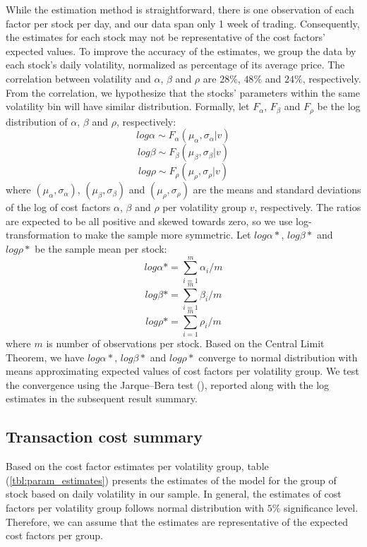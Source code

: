 While the estimation method is straightforward, there is one observation of each factor per stock per day, and our data span only 1 week of trading. Consequently, the estimates for each stock may not be representative of the cost factors' expected values. To improve the accuracy of the estimates, we group the data by each stock's daily volatility, normalized as percentage of its average price. The correlation between volatility and $\alpha$, $\beta$ and $\rho$ are $28\%$, $48\%$ and $24\%$, respectively. From the correlation, we hypothesize that the stocks' parameters within the same volatility bin will have similar distribution. Formally, let $F_\alpha$, $F_\beta$ and $F_\rho$ be the log distribution of $\alpha$, $\beta$ and $\rho$, respectively:
\[
  log \alpha \sim F_\alpha(\mu_\alpha,\sigma_\alpha|v)
\]
\[
  log \beta \sim F_\beta(\mu_\beta,\sigma_\beta|v)
\]
\[
  log \rho \sim F_\rho(\mu_\rho,\sigma_\rho|v)
\]
where $(\mu_\alpha,\sigma_\alpha)$, $(\mu_\beta,\sigma_\beta)$ and $(\mu_\rho,\sigma_\rho)$ are the means and standard deviations of the log of cost factors $\alpha$, $\beta$ and $\rho$ per volatility group $v$, respectively. The ratios are expected to be all positive and skewed towards zero, so we use log-transformation to make the sample more symmetric. Let $log \alpha*$, $log \beta*$ and $log \rho*$ be the sample mean per stock:
\[
  log \alpha* = \sum_{i=1}^m \alpha_i/m
\]
\[
  log \beta* = \sum_{i=1}^m \beta_i/m
\]
\[
  log \rho* = \sum_{i=1}^m \rho_i/m
\]
where $m$ is number of observations per stock. Based on the Central Limit Theorem, we have $log \alpha*$, $log \beta*$ and $log \rho*$ converge to normal distribution with means approximating expected values of cost factors per volatility group. We test the convergence using the Jarque–Bera test (\cite{JarqueBera1980}), reported along with the log estimates in the subsequent result summary.

\subsection{Transaction cost summary}

Based on the cost factor estimates per volatility group, table (\ref{tbl:param_estimates}) presents the estimates of the model for the group of stock based on daily volatility in our sample. In general, the estimates of cost factors per volatility group follows normal distribution with $5\%$ significance level. Therefore, we can assume that the estimates are representative of the expected cost factors per group.

